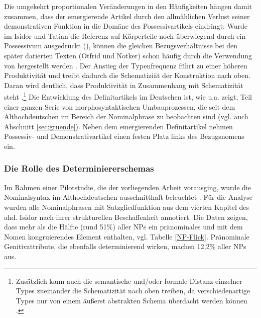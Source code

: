  
Die umgekehrt proportionalen Veränderungen in den Häufigkeiten hängen damit zusammen, dass der emergierende Artikel durch den allmählichen Verlust seiner demonstrativen Funktion in die Domäne des Possessivartikels eindringt: Wurde im Isidor und Tatian die Referenz auf Körperteile noch überwiegend durch ein Possessivum ausgedrückt (), können die gleichen Bezugsverhältnisse bei den später datierten Texten (Otfrid und Notker) schon häufig durch die Verwendung von  hergestellt werden \parencite[z.B. , s.][186]{Oubouzar1997a}. Der Anstieg der Typenfrequenz führt zu einer höheren Produktivität \parencite[vgl.][]{Baayen2009,Bybee2013} und treibt dadurch die Schematiziät der Konstruktion nach oben. Daran wird deutlich, dass Produktivität in Zusammenhang mit Schematizität steht \parencite[][]{Baayen2009}.\footnote{Zusätzlich kann auch die semantische und/oder formale Distanz einzelner Types zueinander die Schematizität nach oben treiben, da verschiedenartige Types nur von einem äußerst abstrakten Schema überdacht werden können \parencite[37]{Barddal2015}.} Die Entwicklung des Definitartikels im Deutschen ist, wie u.a. \textcite{Demske2001} zeigt, Teil einer ganzen Serie von morphosyntaktischen Umbauprozessen, die seit dem Althochdeutschen im Bereich der Nominalphrase zu beobachten sind (vgl. auch Abschnitt \ref{sec:gruende}). Neben dem emergierenden Definitartikel nehmen Possessiv- und Demonstrativartikel einen festen Platz links des Bezugsnomens ein. 

\subsubsection{Die Rolle des Determiniererschemas} 

Im Rahmen einer Pilotstudie, die der vorliegenden Arbeit vorausging, wurde die Nominalsyntax im Althochdeutschen ausschnitthaft beleuchtet \parencite{Flick2018}. Für die Analyse wurden alle Nominalphrasen mit Satzgliedfunktion aus dem vierten Kapitel des ahd. Isidor nach ihrer strukturellen Beschaffenheit annotiert. Die Daten zeigen, dass mehr als die Hälfte (rund 51\%) aller NPs ein pränominales und mit dem Nomen kongruierendes Element enthalten, vgl. Tabelle \ref{NP-Flick}. Pränominale Genitivattribute, die ebenfalls determinierend wirken, machen 12,2\% aller NPs aus. 

